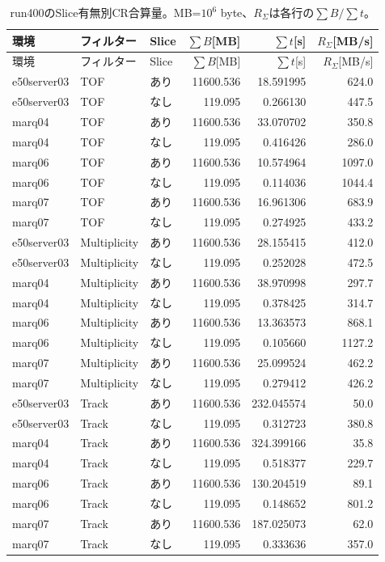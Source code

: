 \begingroup\small\begin{longtable}{lllrrr}
\caption{run400のSlice有無別CR合算量。MB=$10^6$ byte、$R_\Sigma$は各行の$\sum B/\sum t$。}\\
\hline 環境 & フィルター & Slice & $\sum B$[MB] & $\sum t$[s] & $R_\Sigma$[MB/s] \\\hline\endfirsthead
\hline 環境 & フィルター & Slice & $\sum B$[MB] & $\sum t$[s] & $R_\Sigma$[MB/s] \\\hline\endhead
e50server03 & TOF & あり & 11600.536 & 18.591995 & 624.0 \\
e50server03 & TOF & なし & 119.095 & 0.266130 & 447.5 \\
marq04 & TOF & あり & 11600.536 & 33.070702 & 350.8 \\
marq04 & TOF & なし & 119.095 & 0.416426 & 286.0 \\
marq06 & TOF & あり & 11600.536 & 10.574964 & 1097.0 \\
marq06 & TOF & なし & 119.095 & 0.114036 & 1044.4 \\
marq07 & TOF & あり & 11600.536 & 16.961306 & 683.9 \\
marq07 & TOF & なし & 119.095 & 0.274925 & 433.2 \\
e50server03 & Multiplicity & あり & 11600.536 & 28.155415 & 412.0 \\
e50server03 & Multiplicity & なし & 119.095 & 0.252028 & 472.5 \\
marq04 & Multiplicity & あり & 11600.536 & 38.970998 & 297.7 \\
marq04 & Multiplicity & なし & 119.095 & 0.378425 & 314.7 \\
marq06 & Multiplicity & あり & 11600.536 & 13.363573 & 868.1 \\
marq06 & Multiplicity & なし & 119.095 & 0.105660 & 1127.2 \\
marq07 & Multiplicity & あり & 11600.536 & 25.099524 & 462.2 \\
marq07 & Multiplicity & なし & 119.095 & 0.279412 & 426.2 \\
e50server03 & Track & あり & 11600.536 & 232.045574 & 50.0 \\
e50server03 & Track & なし & 119.095 & 0.312723 & 380.8 \\
marq04 & Track & あり & 11600.536 & 324.399166 & 35.8 \\
marq04 & Track & なし & 119.095 & 0.518377 & 229.7 \\
marq06 & Track & あり & 11600.536 & 130.204519 & 89.1 \\
marq06 & Track & なし & 119.095 & 0.148652 & 801.2 \\
marq07 & Track & あり & 11600.536 & 187.025073 & 62.0 \\
marq07 & Track & なし & 119.095 & 0.333636 & 357.0 \\
\hline\end{longtable}\endgroup

